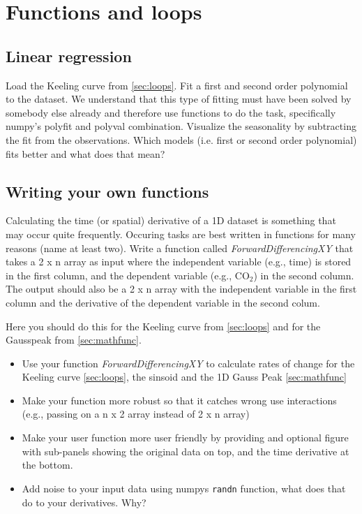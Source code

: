 
\section{Functions and loops}

\subsection{Linear regression}
Load the Keeling curve from \ref{sec:loops}. Fit a first and second order polynomial to the dataset. We understand that this type of fitting must have been solved by somebody else already and therefore use functions to do the task, specifically numpy's polyfit and polyval combination. Visualize the seasonality by subtracting the fit from the observations. Which models (i.e. first or second order polynomial) fits better and what does that mean?


\subsection{Writing your own functions}
Calculating the time (or spatial) derivative of a 1D dataset is something that may occur quite frequently. Occuring tasks are best written in functions for many reasons (name at least two). Write a function called \textit{ForwardDifferencingXY} that takes a 2 x n array as input where the independent variable (e.g., time) is stored in the first column, and the dependent variable (e.g., CO$_2$) in the second column. The output should also be a 2 x n array with the independent variable in the first column and the derivative of the dependent variable in the second colum. 


Here you should do this for the Keeling curve from \ref{sec:loops} and for the Gausspeak from \ref{sec:mathfunc}.
\begin{itemize}
    \item Use your function \textit{ForwardDifferencingXY} to calculate rates of change for the Keeling curve \ref{sec:loops}, the sinsoid and the 1D Gauss Peak \ref{sec:mathfunc}
    \item Make your function more robust so that it catches wrong use interactions (e.g., passing on a n x 2 array instead of 2 x n array)
    \item Make your user function more user friendly by providing and optional figure with sub-panels showing the original data on top, and the time derivative at the bottom. 
    \item Add noise to your input data using numpys \verb|randn| function, what does that do to your derivatives. Why?
\end{itemize}
